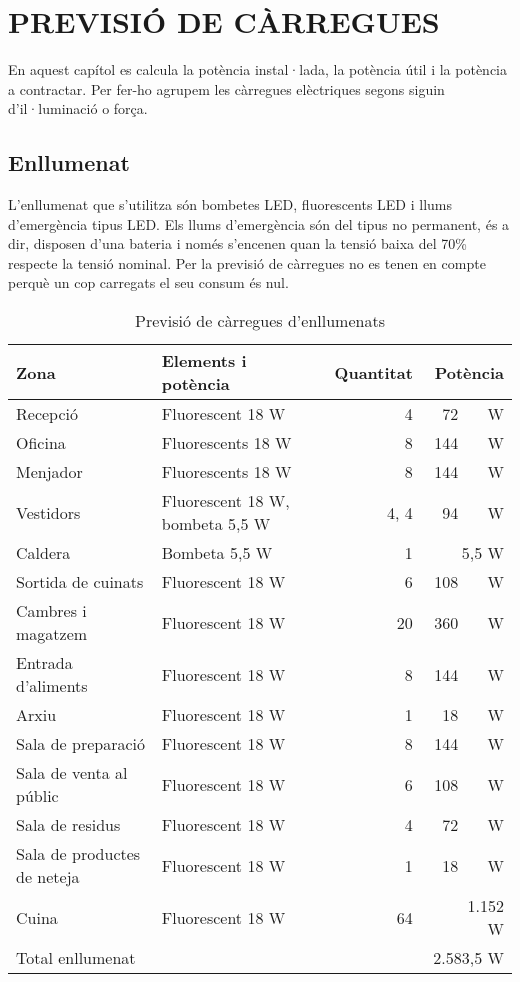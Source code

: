 \chapter{\uppercase{Previsió de càrregues}}
En aquest capítol es calcula la potència instal·lada, la potència útil i la potència a contractar. Per fer-ho agrupem les càrregues elèctriques segons siguin d'il·luminació o força.
\section{Enllumenat}
L'enllumenat que s'utilitza són bombetes LED, fluorescents LED i llums d'emergència tipus LED. 
\newline Els llums d'emergència són del tipus no permanent, és a dir, disposen d'una bateria i només s'encenen quan la tensió baixa del 70\% respecte la tensió nominal.  Per la previsió de càrregues no es tenen en compte perquè un cop carregats el seu consum és nul.
\begin{table}[H]
\small
\begin{center}
 \begin{tabularx}{\textwidth}{|l|X|r|r|}%
 \hline
 Zona & Elements i potència & Quantitat & Potència \\
 \hline
 Recepció & Fluorescent 18 W & 4 & 72 \ \ \ W\\
 Oficina & Fluorescents 18 W & 8 & 144 \ \ \ W\\
 Menjador & Fluorescents 18 W & 8 & 144 \ \ \ W\\
 Vestidors & Fluorescent 18 W, bombeta 5,5 W & 4, 4 & 94 \ \ \ W\\
 Caldera & Bombeta 5,5 W & 1 & 5,5 W\\
 Sortida de cuinats & Fluorescent 18 W & 6 & 108 \ \ \ W\\
 Cambres i magatzem & Fluorescent 18 W & 20 & 360 \ \ \ W\\
 Entrada d'aliments & Fluorescent 18 W & 8 & 144 \ \ \ W\\
 Arxiu & Fluorescent 18 W & 1 & 18 \ \ \ W\\
 Sala de preparació & Fluorescent 18 W & 8 & 144 \ \ \ W\\
 Sala de venta al públic & Fluorescent 18 W & 6 & 108 \ \ \ W\\
 Sala de residus & Fluorescent 18 W & 4 & 72 \ \ \ W\\
 Sala de productes de neteja & Fluorescent 18 W & 1 & 18 \ \ \ W\\
 Cuina & Fluorescent 18 W & 64 & 1.152 \ \ \ W\\
 
  

 \hline
 Total enllumenat & & & 2.583,5 W\\
 \hline
 \end{tabularx}
 \caption{Previsió de càrregues d'enllumenats}
\end{center}
\end{table}
%
%
%
%
%
